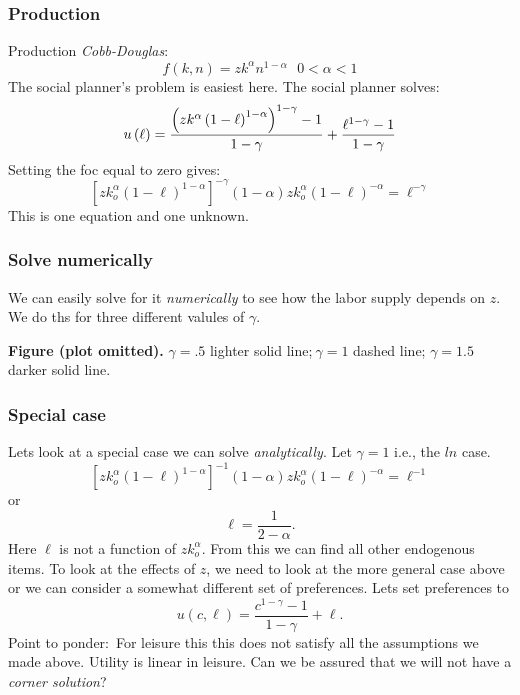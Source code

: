 \documentclass[aspectratio=169]{ltx-talk}
\begin{document}
\begin{frame}
\frametitle{Production }
Production \textit{Cobb-Douglas}:%
\begin{equation*}
f\left( k,n\right) =zk^{\alpha }n^{1-\alpha }\text{ }0<\alpha <1
\end{equation*}%
The social planner's problem is easiest here. The social planner solves:%
\begin{equation*}
u\left( \ell \right) =\frac{\left( zk^{\alpha }\left( 1-\ell \right)
^{1-\alpha }\right) ^{1-\gamma }-1}{1-\gamma }+\frac{\ell ^{1-\gamma }-1}{%
1-\gamma }
\end{equation*}%
Setting the foc equal to zero gives:%
\begin{equation*}
\left[ zk_{o}^{\alpha }\left( 1-\ell \right) ^{1-\alpha }\right] ^{-\gamma
}\left( 1-\alpha \right) zk_{o}^{\alpha }\left( 1-\ell \right) ^{-\alpha
}=\ell ^{-\gamma }
\end{equation*}%
This is one equation and one unknown.
\end{frame}

\begin{frame}
\frametitle{Solve numerically}
We can easily solve for it \textit{numerically} to see how the labor supply
depends on $z$. We do ths for three different valules of $\gamma .$


\par\noindent\textbf{Figure (plot omitted).} $\gamma =.5$ lighter solid
line;$\ \gamma =1$ dashed line; $\gamma =1.5$ darker solid
line.\par
\end{frame}

\begin{frame}
\frametitle{Special case}
Lets look at a special case we can solve \textit{analytically}. Let $\gamma
=1$ i.e., the $ln$ case.%
\begin{equation*}
\left[ zk_{o}^{\alpha }\left( 1-\ell \right) ^{1-\alpha }\right] ^{-1}\left(
1-\alpha \right) zk_{o}^{\alpha }\left( 1-\ell \right) ^{-\alpha }=\ell ^{-1}
\end{equation*}%
or 
\begin{equation*}
\ell =\frac{1}{2-\alpha }.
\end{equation*}%
Here $\ell $ is not a function of $zk_{o}^{\alpha }.$ From this we can find
all other endogenous items. To look at the effects of $z$, we need to look
at the more general case above or we can consider a somewhat different set
of preferences. Lets set preferences to 
\begin{equation*}
u\left( c,\ell \right) =\frac{c^{1-\gamma }-1}{1-\gamma }+\ell .
\end{equation*}%
Point to ponder:\ For leisure this this does not satisfy all the assumptions
we made above. Utility is linear in leisure. Can we be assured that we will
not have a \textit{corner solution}?
\end{frame}
\end{document}
